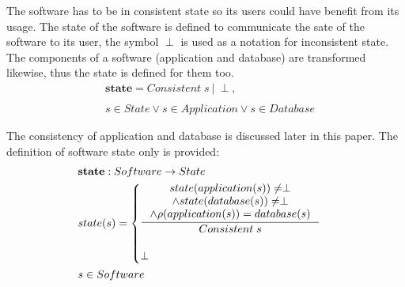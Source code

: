 \documentclass[11pt]{article}
\begin{document}
The software has to be in consistent state so its users could have benefit from its usage. The state of the software is defined to communicate the sate of the software to its user, the symbol $\perp$ is used as a notation for inconsistent state. The components of a software (application and database) are transformed likewise, thus the state is defined for them too.
\begin{align*}
& 	\mathbf{state} = Consistent\; s \: | \: \perp,  \\\\
& 	s \in State \vee s \in Application \vee s \in Database
\end{align*}


The consistency of application and database is discussed later in this paper. The definition of software state only is provided:
\begin{align*}
&	\mathbf{state} : Software \rightarrow State \\
&	state(s) = \begin{cases}
 		\inference{state(application(s)) \neq \perp \\
 		\wedge state(database(s)) \neq \perp \\
 		\wedge \rho(application(s)) = database(s)}{Consistent \; s}\\ \\
 		\perp
 	\end{cases} \\ 
& 	s \in Software
\end{align*}
\end{document}

